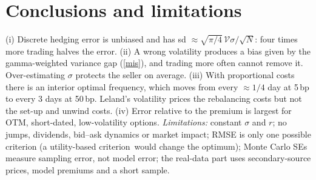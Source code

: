 \documentclass[10pt,a4paper]{article}
\begin{document}
\section{Conclusions and limitations}
(i) Discrete hedging error is unbiased and has sd $\approx\sqrt{\pi/4}\,\mathcal V\sigma/\sqrt N$: four times more trading halves the error.
(ii) A wrong volatility produces a bias given by the gamma-weighted variance gap (\ref{mis}), and trading more often cannot remove it. Over-estimating $\sigma$ protects the seller on average.
(iii) With proportional costs there is an interior optimal frequency, which moves from every ${\approx}1/4$ day at 5\,bp to every 3 days at 50\,bp. Leland's volatility prices the rebalancing costs but not the set-up and unwind costs.
(iv) Error relative to the premium is largest for OTM, short-dated, low-volatility options.
\emph{Limitations:} constant $\sigma$ and $r$; no jumps, dividends, bid--ask dynamics or market impact; RMSE is only one possible criterion (a utility-based criterion\,\cite{toft} would change the optimum); Monte Carlo SEs
measure sampling error, not model error; the real-data part uses secondary-source prices, model premiums and a short sample.
\end{document}
